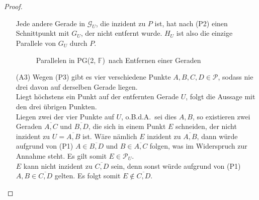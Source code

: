 \documentclass[hidelinks]{article}
\theoremstyle{plain}
\theoremstyle{definition}
\theoremstyle{rem}
\newcommand{\pgtwo}{PG(2, $\mathbb{F}$)\ }
\newcommand{\pu}{\mathcal{P}_U}
\newcommand{\gu}{\mathcal{G}_U}
\begin{document}
\begin{sloppypar}
\begin{proof}
\begin{enumerate}
	Jede andere Gerade in $\gu$, die inzident zu $P$ ist, hat nach (P2) einen Schnittpunkt mit $G_U$, der nicht entfernt wurde. $H_U$ ist also die einzige Parallele von $G_U$ durch $P$.
\begin{figure}[H]
\centering
 \caption{Parallelen in \pgtwo nach Entfernen einer Geraden}
\end{figure}
	\item[(A3)] Wegen (P3) gibt es vier verschiedene Punkte $A,B,C,D\in\mathcal{P}$, sodass nie drei davon auf derselben Gerade liegen.\\
		Liegt höchstens ein Punkt auf der entfernten Gerade $U$, folgt die Aussage mit den drei übrigen Punkten.\\
		Liegen zwei der vier Punkte auf $U$, o.B.d.A.\ sei dies $A,B$, so existieren zwei Geraden $\overline{A,C}$ und $\overline{B,D}$, die sich in einem Punkt $E$ schneiden, der nicht inzident zu $U=\overline{A,B}$ ist.
		Wäre nämlich $E$ inzident zu $\overline{A,B}$, dann würde aufgrund von (P1) $A\in\overline{B,D}$ und $B\in\overline{A,C}$ folgen, was im Widerspruch zur Annahme steht. Es gilt somit $E\in\pu$.\\
$E$ kann nicht inzident zu $\overline{C,D}$ sein, denn sonst würde aufgrund von (P1) $A,B\in\overline{C,D}$ gelten. Es folgt somit $E\notin\overline{C,D}$.
\begin{figure}[H]
\centering
\end{figure}
\end{enumerate}
\end{proof}
\end{sloppypar}
\end{document}
